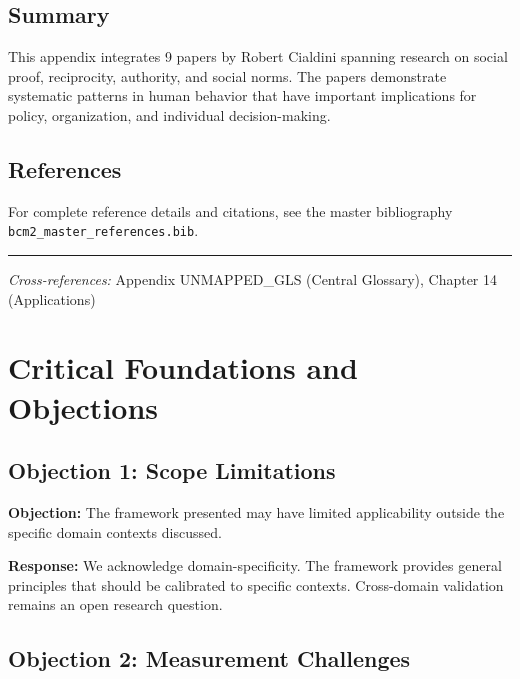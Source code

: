 \subsection{Summary}

This appendix integrates 9 papers by Robert Cialdini
spanning research on social proof, reciprocity, authority, and social norms.
The papers demonstrate systematic patterns in human behavior that have important
implications for policy, organization, and individual decision-making.

\subsection{References}

For complete reference details and citations, see the master bibliography
\texttt{bcm2\_master\_references.bib}.

\vspace{1em}
\hrule
\vspace{0.5em}

\noindent\textit{Cross-references:}
Appendix UNMAPPED_GLS (Central Glossary), Chapter 14 (Applications)



\section{Critical Foundations and Objections}
\label{sec:cia-foundations}

\subsection{Objection 1: Scope Limitations}

\textbf{Objection:} The framework presented may have limited applicability
outside the specific domain contexts discussed.

\textbf{Response:} We acknowledge domain-specificity. The framework provides
general principles that should be calibrated to specific contexts. Cross-domain
validation remains an open research question.

\subsection{Objection 2: Measurement Challenges}

